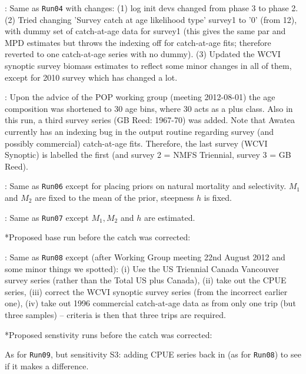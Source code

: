 : Same as {\tt Run04} with changes: (1) log init devs changed from phase 3 to phase 2. (2) Tried changing 'Survey catch at age likelihood type' survey1 to '0' (from 12), with dummy set of catch-at-age data for survey1 (this gives the same par and MPD estimates but throws the indexing off for catch-at-age fits; therefore reverted to one catch-at-age series with no dummy). (3) Updated the WCVI synoptic survey biomass estimates to reflect some minor changes in all of them, except for 2010 survey which has changed a lot. \newline


: Upon the advice of the POP working group (meeting 2012-08-01) the age composition was shortened to 30 age bins, where 30 acts as a plus class. Also in this run, a third survey series (GB Reed: 1967-70) was added. Note that Awatea currently has an indexing bug in the output routine regarding survey (and possibly commercial) catch-at-age fits. Therefore, the last survey (WCVI Synoptic) is labelled the first (and survey 2 = NMFS Triennial, survey 3 = GB Reed). \newline

: Same as {\tt Run06} except for placing priors on natural mortality and selectivity. $M_1$ and $M_2$ are fixed to the mean of the prior, steepness $h$ is fixed.  \newline

: Same as {\tt Run07} except $M_1, M_2$ and $h$ are estimated. \newline

\noindent **Proposed base run before the catch was corrected:

: Same as {\tt Run08} except (after Working Group meeting 22nd August 2012 and some minor things we spotted): (i) Use the US Triennial Canada Vancouver survey series (rather than the Total US plus Canada), (ii) take out the CPUE series, (iii) correct the WCVI synoptic survey series (from the incorrect earlier one), (iv) take out 1996 commercial catch-at-age data as from only one trip (but three samples) -- criteria is then that three trips are required. \newline

\noindent **Proposed senstivity runs before the catch was corrected:

 As for {\tt Run09}, but sensitivity S3: adding CPUE series back in (as for {\tt Run08}) to see if it makes a difference.    \newline

